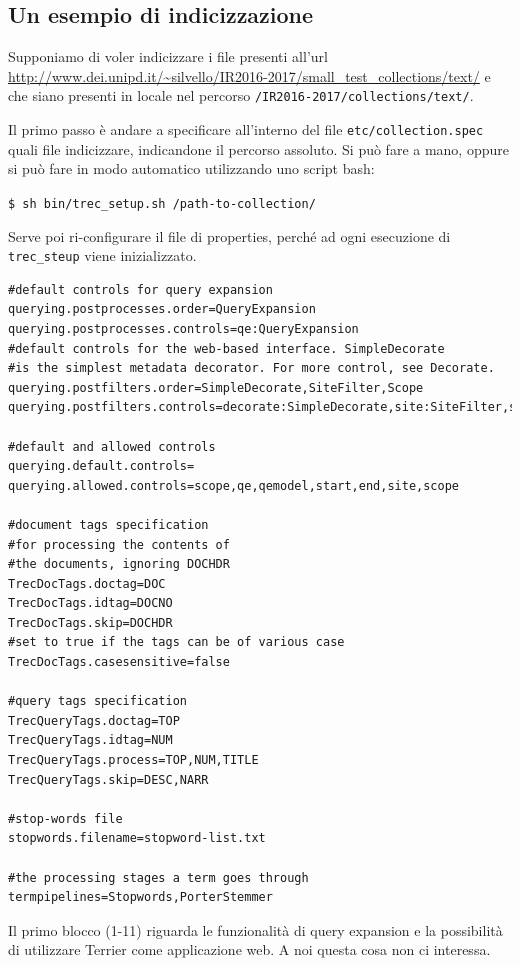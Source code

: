 \subsection{Un esempio di indicizzazione}

Supponiamo di voler indicizzare i file presenti all'url \url{http://www.dei.unipd.it/~silvello/IR2016-2017/small_test_collections/text/} e che siano presenti in locale nel percorso \texttt{/IR2016-2017/collections/text/}.

Il primo passo è andare a specificare all'interno del file \texttt{etc/collection.spec} quali file indicizzare, indicandone il percorso assoluto.
Si può fare a mano, oppure si può fare in modo automatico utilizzando uno script bash:

\begin{center}
	\texttt{\$ sh bin/trec\_setup.sh /path-to-collection/}
\end{center}

\noindent Serve poi ri-configurare il file di properties, perché ad ogni esecuzione di \texttt{trec\_steup} viene inizializzato.

\begin{lstlisting}
#default controls for query expansion
querying.postprocesses.order=QueryExpansion
querying.postprocesses.controls=qe:QueryExpansion
#default controls for the web-based interface. SimpleDecorate
#is the simplest metadata decorator. For more control, see Decorate.
querying.postfilters.order=SimpleDecorate,SiteFilter,Scope
querying.postfilters.controls=decorate:SimpleDecorate,site:SiteFilter,scope:Scope

#default and allowed controls
querying.default.controls=
querying.allowed.controls=scope,qe,qemodel,start,end,site,scope

#document tags specification
#for processing the contents of
#the documents, ignoring DOCHDR
TrecDocTags.doctag=DOC
TrecDocTags.idtag=DOCNO
TrecDocTags.skip=DOCHDR
#set to true if the tags can be of various case
TrecDocTags.casesensitive=false

#query tags specification
TrecQueryTags.doctag=TOP
TrecQueryTags.idtag=NUM
TrecQueryTags.process=TOP,NUM,TITLE
TrecQueryTags.skip=DESC,NARR

#stop-words file
stopwords.filename=stopword-list.txt

#the processing stages a term goes through
termpipelines=Stopwords,PorterStemmer
\end{lstlisting}

\noindent Il primo blocco (1-11) riguarda le funzionalità di query expansion e la possibilità di utilizzare Terrier come applicazione web. A noi questa cosa non ci interessa.

